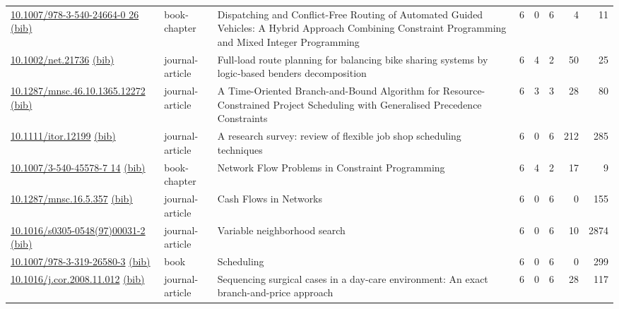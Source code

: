 {\begin{longtable}{p{5cm}lp{11cm}rrrrr}
\href{http://dx.doi.org/10.1007/978-3-540-24664-0_26}{10.1007/978-3-540-24664-0 26} \href{https://www.doi2bib.org/bib/10.1007/978-3-540-24664-0_26}{(bib)} & book-chapter & Dispatching and Conflict-Free Routing of Automated Guided Vehicles: A Hybrid Approach Combining Constraint Programming and Mixed Integer Programming & 6 & 0 & 6 & 4 & 11 \\
\href{http://dx.doi.org/10.1002/net.21736}{10.1002/net.21736} \href{https://www.doi2bib.org/bib/10.1002/net.21736}{(bib)} & journal-article & Full‐load route planning for balancing bike sharing systems by logic‐based benders decomposition & 6 & 4 & 2 & 50 & 25 \\
\href{http://dx.doi.org/10.1287/mnsc.46.10.1365.12272}{10.1287/mnsc.46.10.1365.12272} \href{https://www.doi2bib.org/bib/10.1287/mnsc.46.10.1365.12272}{(bib)} & journal-article & A Time-Oriented Branch-and-Bound Algorithm for Resource-Constrained Project Scheduling with Generalised Precedence Constraints & 6 & 3 & 3 & 28 & 80 \\
\href{http://dx.doi.org/10.1111/itor.12199}{10.1111/itor.12199} \href{https://www.doi2bib.org/bib/10.1111/itor.12199}{(bib)} & journal-article & A research survey: review of flexible job shop scheduling techniques & 6 & 0 & 6 & 212 & 285 \\
\href{http://dx.doi.org/10.1007/3-540-45578-7_14}{10.1007/3-540-45578-7 14} \href{https://www.doi2bib.org/bib/10.1007/3-540-45578-7_14}{(bib)} & book-chapter & Network Flow Problems in Constraint Programming & 6 & 4 & 2 & 17 & 9 \\
\href{http://dx.doi.org/10.1287/mnsc.16.5.357}{10.1287/mnsc.16.5.357} \href{https://www.doi2bib.org/bib/10.1287/mnsc.16.5.357}{(bib)} & journal-article & Cash Flows in Networks & 6 & 0 & 6 & 0 & 155 \\
\href{http://dx.doi.org/10.1016/s0305-0548(97)00031-2}{10.1016/s0305-0548(97)00031-2} \href{https://www.doi2bib.org/bib/10.1016/s0305-0548(97)00031-2}{(bib)} & journal-article & Variable neighborhood search & 6 & 0 & 6 & 10 & 2874 \\
\href{http://dx.doi.org/10.1007/978-3-319-26580-3}{10.1007/978-3-319-26580-3} \href{https://www.doi2bib.org/bib/10.1007/978-3-319-26580-3}{(bib)} & book & Scheduling & 6 & 0 & 6 & 0 & 299 \\
\href{http://dx.doi.org/10.1016/j.cor.2008.11.012}{10.1016/j.cor.2008.11.012} \href{https://www.doi2bib.org/bib/10.1016/j.cor.2008.11.012}{(bib)} & journal-article & Sequencing surgical cases in a day-care environment: An exact branch-and-price approach & 6 & 0 & 6 & 28 & 117 \\

\end{longtable}}
